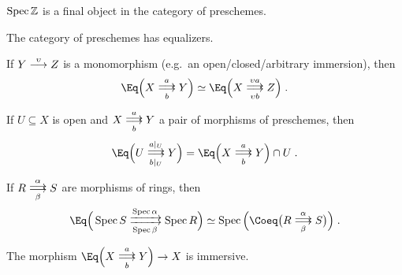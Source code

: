 \documentclass[a4paper,parskip=half,numbers=enddot, DIV=12]{scrreprt}
\begin{document}
\begin{cor}
	$\operatorname{Spec}\mathbb{Z}$ is a final object in the category of preschemes.
\end{cor}
\begin{cor}
	\begin{alphanumerate}
		\item {}The category of preschemes has equalizers.
		\item If $Y\morphism[\upsilon]Z$ is a monomorphism (e.g.\ an open/closed/arbitrary immersion), then
		\begin{align*}
			\Eq\Big(X\doublemorphism[a][b]Y\Big)\simeq\Eq\Big(X\doublemorphism[\upsilon a][\upsilon b]Z\Big)\;.
		\end{align*}
		\item If $U\subseteq X$ is open and $X\doublemorphism[\smash{a}][b]Y$ a pair of morphisms of preschemes, then
		\begin{align*}
			\Eq\Big(U\doublemorphism[a|_U][b|_U]Y\Big)=\Eq\Big(X\doublemorphism[a][b]Y\Big)\cap U\;.
		\end{align*}
		\item If $R\doublemorphism[\smash{\alpha}][\smash{\beta}]S$ are morphisms of rings, then
		\begin{align*}
			\Eq\Big(\Spec S\xdoublemorphism[\Spec \alpha][\Spec \beta]\Spec R\Big)\simeq \Spec\Big(\Coeq\big(R\doublemorphism[\smash{\alpha}][\smash{\beta}]S\big)\Big)\;.
		\end{align*}
		\item The morphism $\Eq\Big(X\doublemorphism[a][b]Y\Big)\morphism X$ is immersive.
	\end{alphanumerate}
\end{cor}
\end{document}
